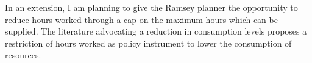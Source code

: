 \begin{comment}
Preferences and the trade-off between leisure and consumption determining household behaviour seem to be key to the results. As argued by \cite{Boppart2019labourPerspectiveb}, the intensive margin of hours worked have been falling steadily over the last 130 years. They argue for the consistency of preferences which feature a slightly higher income effect than substitution effect. In the current model with log-utility and representative family framework,  the substitution effects offset each other. With the preferences suggested in \cite{Boppart2019labourPerspectiveb}, growth would affect hours worked, assumably changing the optimal policy. It could, for instance, be the case, that growth has to be slowed down even more, to prevent too high work efforts and consumption levels. %

content...
\end{comment}


In an extension, I am planning to give the Ramsey planner the opportunity to reduce hours worked through a cap on the maximum hours which can be supplied. The literature advocating a reduction in consumption levels \cite{Schor2005SustainableReduction} proposes a restriction of hours worked as policy instrument to lower the consumption of resources.

%

